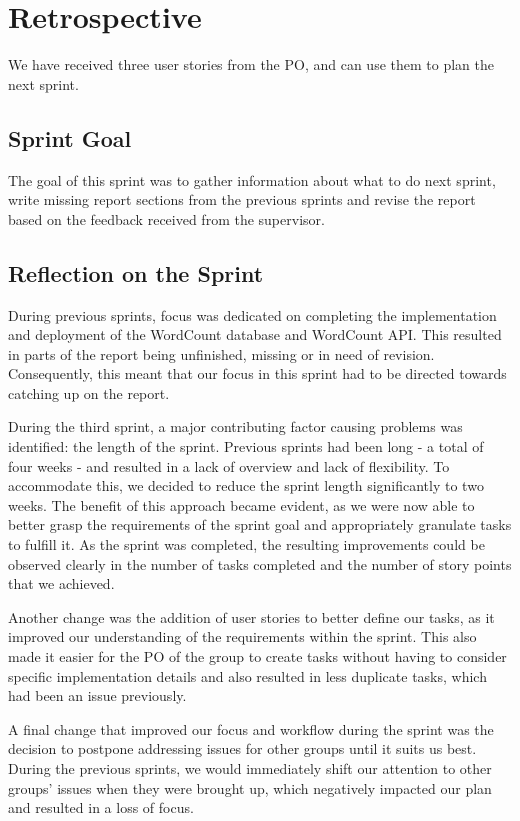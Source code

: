 \section{Retrospective}
We have received three user stories from the PO, and can use them to plan the next sprint.

\subsection{Sprint Goal}
The goal of this sprint was to gather information about what to do next sprint, write missing report sections from the previous sprints and revise the report based on the feedback received from the supervisor. 

\subsection{Reflection on the Sprint}
During previous sprints, focus was dedicated on completing the implementation and deployment of the WordCount database and WordCount API. This resulted in parts of the report being unfinished, missing or in need of revision. Consequently, this meant that our focus in this sprint had to be directed towards catching up on the report.


During the third sprint, a major contributing factor causing problems was identified: the length of the sprint. Previous sprints had been long - a total of four weeks - and resulted in a lack of overview and lack of flexibility. To accommodate this, we decided to reduce the sprint length significantly to two weeks. The benefit of this approach became evident, as we were now able to better grasp the requirements of the sprint goal and appropriately granulate tasks to fulfill it. As the sprint was completed, the resulting improvements could be observed clearly in the number of tasks completed and the number of story points that we achieved. 


Another change was the addition of user stories to better define our tasks, as it improved our understanding of the requirements within the sprint. This also made it easier for the PO of the group to create tasks without having to consider specific implementation details and also resulted in less duplicate tasks, which had been an issue previously.


A final change that improved our focus and workflow during the sprint was the decision to postpone addressing issues for other groups until it suits us best. During the previous sprints, we would immediately shift our attention to other groups' issues when they were brought up, which negatively impacted our plan and resulted in a loss of focus.

